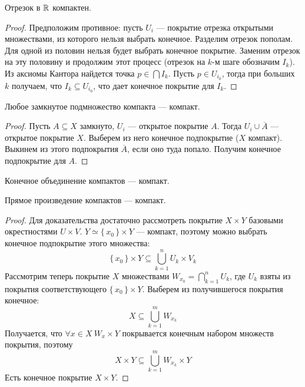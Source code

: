 \begin{theorem}
	Отрезок в $\mathbb{R}$ компактен.
\end{theorem}
\begin{proof}
	Предположим противное: пусть $U_i$ --- покрытие отрезка открытыми множествами,
	из которого нельзя выбрать конечное. Разделим отрезок пополам. Для одной из
	половин нельзя будет выбрать конечное покрытие. Заменим отрезок на эту половину
	и продолжим этот процесс (отрезок на $k$-м шаге обозначим $I_k$).
	Из аксиомы Кантора найдется точка $p \in \bigcap{I_k}$. Пусть $p \in U_{i_0}$,
	тогда при больших $k$ получаем, что $I_k \subseteq U_{i_0}$, что дает конечное
	покрытие для $I_k$.
\end{proof}

\begin{theorem}
	Любое замкнутое подмножество компакта --- компакт.
\end{theorem}
\begin{proof}
	Пусть $A \subseteq X$ замкнуто, $U_i$ --- открытое покрытие $A$.
	Тогда $U_i \cup \overline{A}$ --- открытое покрытие $X$. Выберем из него
	конечное подпокрытие ($X$ компакт). Выкинем из этого подпокрытия $\overline{A}$,
	если оно туда попало. Получим конечное подпокрытие для $A$.
\end{proof}

\begin{remark}
    Конечное объединение компактов --- компакт.
\end{remark}

\begin{theorem}
	Прямое произведение компактов --- компакт.
\end{theorem}
\begin{proof}
	Для доказательства достаточно рассмотреть покрытие $X \times Y$ базовыми
	окрестностями $U \times V$. $Y \simeq \{\,x_0\,\} \times Y$ --- компакт,
	поэтому можно выбрать конечное подпокрытие этого множества:
\[
	\{\,x_0\,\} \times Y \subseteq \bigcup_{k = 1}^{n}{U_k \times V_k}
\]
	Рассмотрим теперь покрытие $X$ множествами $W_{x_0} = \bigcap_{k = 1}^{n}{U_k}$,
	где $U_k$ взяты из покрытия соответствующего $\{\,x_0\,\} \times Y$. Выберем
	из получившегося покрытия конечное:
\[
	X \subseteq \bigcup_{k = 1}^{m}{W_{x_k}}
\]
	Получается, что $\forall x \in X~ W_x \times Y$ покрывается конечным набором
	множеств покрытия, поэтому
\[
	X \times Y \subseteq \bigcup_{k = 1}^{m}{W_{x_k} \times Y}
\]
	Есть конечное покрытие $X \times Y$.
\end{proof}


